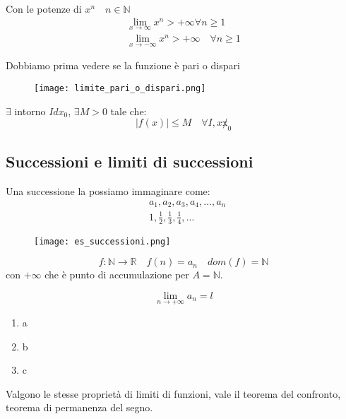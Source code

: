 \documentclass[../main.tex, class=article, 12pt]{subfiles}
\begin{document}
Con le potenze di $ x^n \quad n \in \mathbb{N} $
\begin{align*}
        \lim_{x \to \infty} x^n > +\infty \forall n \ge 1 \\
        \lim_{x \to -\infty} x^n > +\infty \quad \forall n \ge 1 
\end{align*}



Dobbiamo prima vedere se la funzione è pari o dispari
\begin{figure}[H]
  	\texttt{[image: limite\_pari\_o\_dispari.png]}
  	\caption{}
\end{figure}



\begin{corollario}
        $ \exists  $ intorno $ Idx_0 $, $ \exists M > 0 $ tale che:
        \begin{equation*}
                |f(x)| \le M \quad \forall I, x \not x_0
        \end{equation*}
        
\end{corollario}



\newpage
\subsection{Successioni e limiti di successioni}\label{sec:successioni}
\begin{definition}
        Una successione la possiamo immaginare come:
        \begin{align*}
                & a_1, a_2, a_3,a_4,\ldots, a_n \\
                & 1, \frac{1}{2}, \frac{1}{3}, \frac{1}{4},\ldots
        \end{align*}
\end{definition}

\begin{figure}[H]
  	\texttt{[image: es\_successioni.png]}
  	\caption{}
        \label{fig:es_successioni.png}
\end{figure}

\begin{equation*}
        f : \mathbb{N} \to \mathbb{R} \quad  f(n) = a_n \quad  dom(f) = \mathbb{N}
\end{equation*}
con $ +\infty $ che è punto di accumulazione per $ A = \mathbb{N} $.

\begin{equation*}
        \lim_{n \to +\infty} a_n = l
\end{equation*}
\begin{enumerate}
        \item a
        \item b
        \item c
\end{enumerate}

Valgono le stesse proprietà di limiti di funzioni, vale il teorema del confronto, teorema di permanenza del segno.
\end{document}
